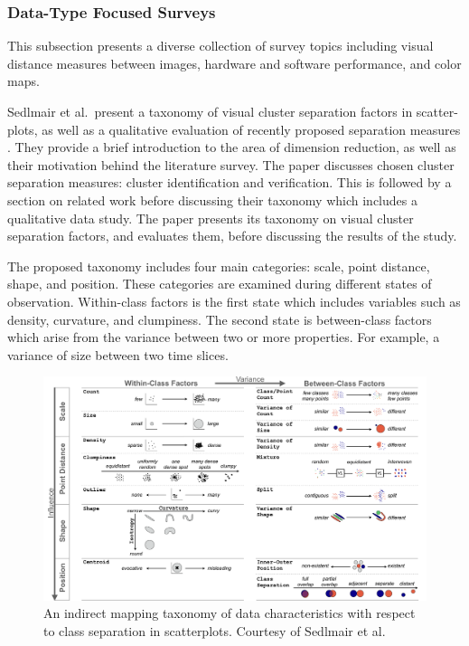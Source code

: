 \subsubsection{Data-Type Focused Surveys}
This subsection presents a diverse collection of survey topics including visual distance measures between images, hardware and software performance, and color maps.


Sedlmair et al.\ present a taxonomy of visual cluster separation factors in scatter-plots, as well as a qualitative evaluation of recently proposed separation measures \cite{sedlmair2012taxonomy}.
They provide a brief introduction to the area of dimension reduction, as well as their motivation behind the literature survey. The paper discusses chosen cluster separation measures: cluster identification and verification. This is followed by a section on related work before discussing their taxonomy which includes a qualitative data study.
The paper presents its taxonomy on visual cluster separation factors, and evaluates them, before discussing the results of the study.

The proposed taxonomy includes four main categories: scale, point distance, shape, and position. These   categories are examined during different states of observation. Within-class factors is the first state which includes variables such as density, curvature, and clumpiness. The second state is between-class factors which arise from the variance between two or more properties. For example, a variance of size between two time slices.

\begin{figure}[t]
\begin{center}
\includegraphics[width=1\textwidth]{images/sedlmair2012taxonomyFull}
\caption{An indirect mapping taxonomy of data characteristics with respect to class separation in scatterplots. Courtesy of Sedlmair et al.\ \cite{sedlmair2012taxonomy}} \label{fig: sedlmair2012taxonomy}
\end{center}
\end{figure}

